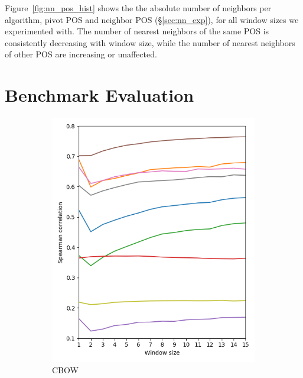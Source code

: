 \documentclass[11pt,a4paper]{article}
\begin{document}
    Figure~\ref{fig:nn_pos_hist} shows the the absolute number of neighbors per algorithm,
    pivot POS and neighbor POS (\S\ref{sec:nn_exp}), for all window sizes we experimented with.
    The number of nearest neighbors of the same POS is consistently decreasing with window size,
    while the number of nearest neighbors of other POS are increasing or unaffected.
    
\section{Benchmark Evaluation}\label{appendix:benchmrak}
    
    \begin{figure}[t]
        \begin{subfigure}[b]{\columnwidth}
        \includegraphics[width=\columnwidth]{figs/similarities_fasttext_enwiki-20170501-clean_cbow-300d-min500_eval.png}
        \caption{CBOW}
        \end{subfigure}
        \begin{subfigure}[b]{\columnwidth}

\end{subfigure}
\end{figure}
\end{document}
